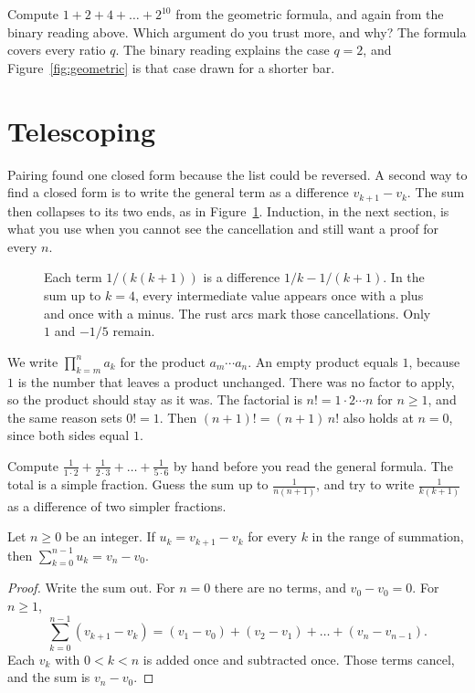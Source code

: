 \begin{think}
Compute $1+2+4+\dots+2^{10}$ from the geometric formula, and again from the binary reading above. Which argument do you trust more, and why? The formula covers every ratio $q$. The binary reading explains the case $q=2$, and Figure~\ref{fig:geometric} is that case drawn for a shorter bar.
\end{think}

\section{Telescoping}\label{sec:telescope}

Pairing found one closed form because the list could be reversed. A second way to find a closed form is to write the general term as a difference $v_{k+1}-v_k$. The sum then collapses to its two ends, as in Figure~\ref{fig:telescope}. Induction, in the next section, is what you use when you cannot see the cancellation and still want a proof for every $n$.

\begin{figure}[ht]
\centering
{}
\caption{Each term $1/(k(k+1))$ is a difference $1/k-1/(k+1)$. In the sum up to $k=4$, every intermediate value appears once with a plus and once with a minus. The rust arcs mark those cancellations. Only $1$ and $-1/5$ remain.}
\label{fig:telescope}
\end{figure}

We write $\prod_{k=m}^n a_k$ for the product $a_m\cdots a_n$. An empty product equals $1$, because $1$ is the number that leaves a product unchanged. There was no factor to apply, so the product should stay as it was. The factorial is $n!=1\cdot2\cdots n$ for $n\ge1$, and the same reason sets $0!=1$. Then $(n+1)!=(n+1)\,n!$ also holds at $n=0$, since both sides equal $1$.

\begin{think}
Compute $\frac1{1\cdot2}+\frac1{2\cdot3}+\dots+\frac1{5\cdot6}$ by hand before you read the general formula. The total is a simple fraction. Guess the sum up to $\frac1{n(n+1)}$, and try to write $\frac1{k(k+1)}$ as a difference of two simpler fractions.
\end{think}

\begin{proposition}\label{prop:telescope}
Let $n\ge0$ be an integer. If $u_k=v_{k+1}-v_k$ for every $k$ in the range of summation, then $\displaystyle\sum_{k=0}^{n-1}u_k=v_n-v_0$.
\end{proposition}
\begin{proof}
Write the sum out. For $n=0$ there are no terms, and $v_0-v_0=0$. For $n\ge1$,
\[
\sum_{k=0}^{n-1}(v_{k+1}-v_k)=(v_1-v_0)+(v_2-v_1)+\dots+(v_n-v_{n-1}).
\]
Each $v_k$ with $0<k<n$ is added once and subtracted once. Those terms cancel, and the sum is $v_n-v_0$.
\end{proof}

